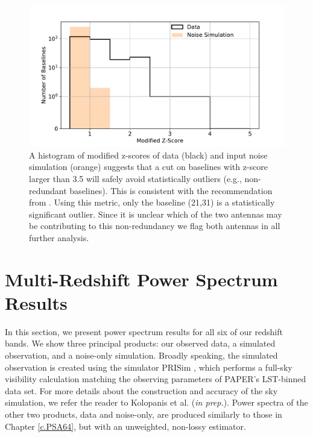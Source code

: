 \begin{figure}[tp]
	\centering
	\includegraphics[width=.85\textwidth]{plots/zscore_hist.pdf}
	\caption{A histogram of modified z-scores of data (black) 
		and input noise simulation (orange) suggests that a cut on baselines
		with z-score larger than 3.5 will safely avoid statistically outliers (e.g., non-redundant baselines). This is consistent with the
		recommendation from \cite{Iglewicz_and_hoaglin}. Using this metric,
		only the baseline (21,31) is a statistically significant outlier. Since it is unclear which of the two antennas may be contributing to this non-redundancy we flag both antennas in all further analysis.} %
\label{fig:mod_z_score_avg}
\end{figure}

\section{Multi-Redshift Power Spectrum Results}

In this section, we present power spectrum results for all six of our redshift bands. We show three principal products: our observed data, a simulated observation, and a noise-only simulation. Broadly speaking, the simulated observation is created using the simulator PRISim \citep{Thyagarajan_et_al2015a, Thyagarajan_et_al2015b}, which performs a full-sky visibility calculation matching the observing parameters of PAPER's LST-binned data set. For more details about the construction and accuracy of the sky simulation, we refer the reader to Kolopanis et al. (\textit{in prep.}). Power spectra of the other two products, data and noise-only, are produced similarly to those in Chapter \ref{c.PSA64}, but with an unweighted, non-lossy estimator.


